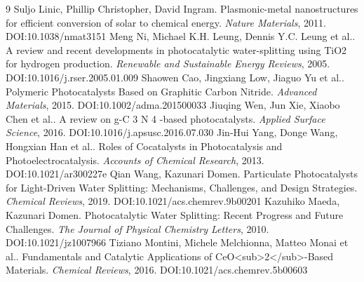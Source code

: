 \documentclass[11pt]{article}
\begin{document}
\begin{thebibliography}{9}
 Suljo Linic, Phillip Christopher, David Ingram. Plasmonic-metal nanostructures for efficient conversion of solar to chemical energy. \emph{Nature Materials}, 2011. DOI:10.1038/nmat3151
 Meng Ni, Michael K.H. Leung, Dennis Y.C. Leung et al.. A review and recent developments in photocatalytic water-splitting using TiO2 for hydrogen production. \emph{Renewable and Sustainable Energy Reviews}, 2005. DOI:10.1016/j.rser.2005.01.009
 Shaowen Cao, Jingxiang Low, Jiaguo Yu et al.. Polymeric Photocatalysts Based on Graphitic Carbon Nitride. \emph{Advanced Materials}, 2015. DOI:10.1002/adma.201500033
 Jiuqing Wen, Jun Xie, Xiaobo Chen et al.. A review on g-C 3 N 4 -based photocatalysts. \emph{Applied Surface Science}, 2016. DOI:10.1016/j.apsusc.2016.07.030
 Jin‐Hui Yang, Donge Wang, Hongxian Han et al.. Roles of Cocatalysts in Photocatalysis and Photoelectrocatalysis. \emph{Accounts of Chemical Research}, 2013. DOI:10.1021/ar300227e
 Qian Wang, Kazunari Domen. Particulate Photocatalysts for Light-Driven Water Splitting: Mechanisms, Challenges, and Design Strategies. \emph{Chemical Reviews}, 2019. DOI:10.1021/acs.chemrev.9b00201
 Kazuhiko Maeda, Kazunari Domen. Photocatalytic Water Splitting: Recent Progress and Future Challenges. \emph{The Journal of Physical Chemistry Letters}, 2010. DOI:10.1021/jz1007966
 Tiziano Montini, Michele Melchionna, Matteo Monai et al.. Fundamentals and Catalytic Applications of CeO<sub>2</sub>-Based Materials. \emph{Chemical Reviews}, 2016. DOI:10.1021/acs.chemrev.5b00603
\end{thebibliography}
\end{document}

